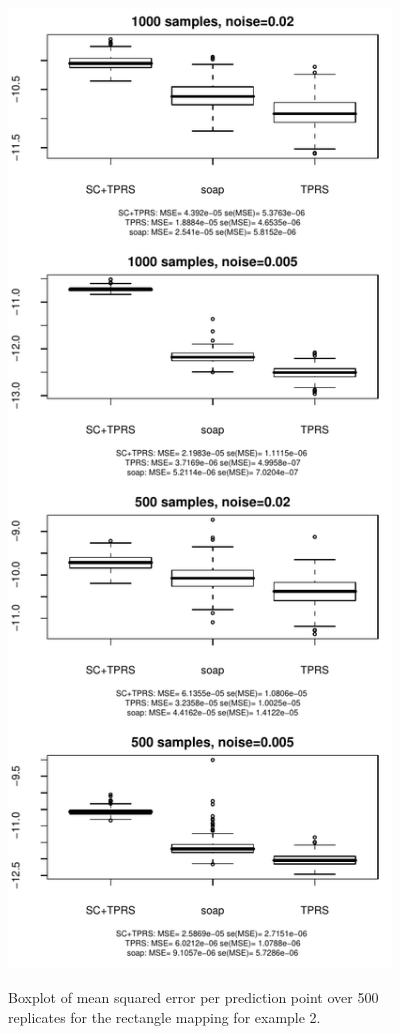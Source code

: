\documentclass[a4paper,10pt]{amsart}
\begin{document}
\begin{figure}[p]
\centering
\includegraphics[width=4in]{figs-otherdomains/wigglytop-boxplot.pdf} \\
\caption{Boxplot of mean squared error per prediction point over 500 replicates for the rectangle mapping for example 2. }
\label{wigglytop-boxplots}
\end{figure}
\end{document}
